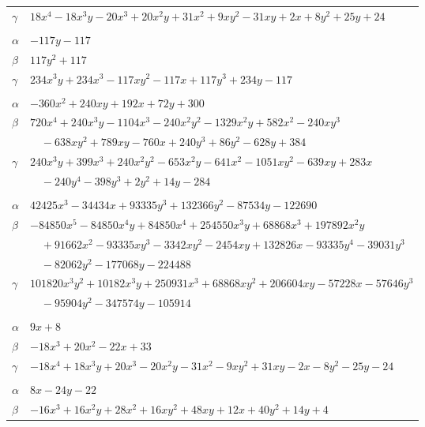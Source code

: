 \documentclass[11pt]{article}
\begin{document}
\begin{longtable}{@{}ll@{}}
$\gamma$ & $18x^{4}-18x^{3}y-20x^{3}+20x^{2}y+31x^{2}+9xy^{2}-31xy+2x+8y^{2}+25y+24$\\
\addlinespace[3pt]
\multicolumn{2}{@{}l}{$\{i,j\}=\{35,49\}$, $k_{ij}=2\cdot 3^{2}\cdot 13$}\\
$\alpha$ & $-117y-117$\\
$\beta$ & $117y^{2}+117$\\
$\gamma$ & $234x^{3}y+234x^{3}-117xy^{2}-117x+117y^{3}+234y-117$\\
\addlinespace[3pt]
\multicolumn{2}{@{}l}{$\{i,j\}=\{35,64\}$, $k_{ij}=2^{2}\cdot 3\cdot 7$}\\
$\alpha$ & $-360x^{2}+240xy+192x+72y+300$\\
$\beta$ & $720x^{4}+240x^{3}y-1104x^{3}-240x^{2}y^{2}-1329x^{2}y+582x^{2}-240xy^{3}$\\
 & $\quad -638xy^{2}+789xy-760x+240y^{3}+86y^{2}-628y+384$\\
$\gamma$ & $240x^{3}y+399x^{3}+240x^{2}y^{2}-653x^{2}y-641x^{2}-1051xy^{2}-639xy+283x$\\
 & $\quad -240y^{4}-398y^{3}+2y^{2}+14y-284$\\
\addlinespace[3pt]
\multicolumn{2}{@{}l}{$\{i,j\}=\{35,65\}$, $k_{ij}=2^{2}\cdot 3\cdot 7^{3}$}\\
$\alpha$ & $42425x^{3}-34434x+93335y^{3}+132366y^{2}-87534y-122690$\\
$\beta$ & $-84850x^{5}-84850x^{4}y+84850x^{4}+254550x^{3}y+68868x^{3}+197892x^{2}y$\\
 & $\quad +91662x^{2}-93335xy^{3}-3342xy^{2}-2454xy+132826x-93335y^{4}-39031y^{3}$\\
 & $\quad -82062y^{2}-177068y-224488$\\
$\gamma$ & $101820x^{3}y^{2}+10182x^{3}y+250931x^{3}+68868xy^{2}+206604xy-57228x-57646y^{3}$\\
 & $\quad -95904y^{2}-347574y-105914$\\
\addlinespace[3pt]
\multicolumn{2}{@{}l}{$\{i,j\}=\{35,84\}$, $k_{ij}=1$}\\
$\alpha$ & $9x+8$\\
$\beta$ & $-18x^{3}+20x^{2}-22x+33$\\
$\gamma$ & $-18x^{4}+18x^{3}y+20x^{3}-20x^{2}y-31x^{2}-9xy^{2}+31xy-2x-8y^{2}-25y-24$\\
\addlinespace[3pt]
\multicolumn{2}{@{}l}{$\{i,j\}=\{35,100\}$, $k_{ij}=2\cdot 3$}\\
$\alpha$ & $8x-24y-22$\\
$\beta$ & $-16x^{3}+16x^{2}y+28x^{2}+16xy^{2}+48xy+12x+40y^{2}+14y+4$\\

\end{longtable}
\end{document}
